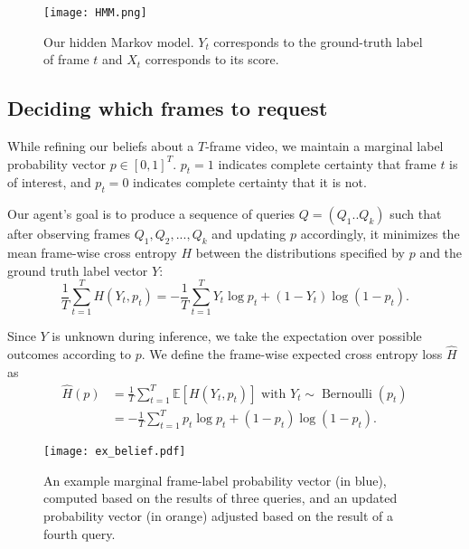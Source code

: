 \documentclass[10pt,twocolumn,letterpaper]{article}
\begin{document}
\begin{figure}[t]
\begin{center}
    \vspace{0.5cm}    
    \texttt{[image: HMM.png]}
\end{center}
   \caption{Our hidden Markov model. $Y_t$ corresponds to the ground-truth label of frame $t$ and $X_t$ corresponds to its score.}
\label{hmm}
\end{figure}

\subsection{Deciding which frames to request}

While refining our beliefs about a $T$-frame video, we maintain a marginal label probability vector $p \in [0,1]^T$. $p_t = 1$ indicates complete certainty that frame $t$ is of interest, and $p_t = 0$ indicates complete certainty that it is not.

Our agent's goal is to produce a sequence of queries $Q = (Q_1..Q_k)$ such that after observing frames $Q_1, Q_2, ..., Q_k$ and updating $p$ accordingly, it minimizes the mean frame-wise cross entropy $H$ between the distributions specified by $p$ and the ground truth label vector $Y$:
$$
    \frac{1}{T} \sum_{t=1}^T H(Y_t, p_t) =
        - \frac{1}{T} \sum_{t=1}^T {
            Y_t \log p_t
            + (1 - Y_t) \log (1 - p_t)
        }.
$$

Since $Y$ is unknown during inference, we take the expectation over possible outcomes according to $p$. We define the frame-wise expected cross entropy loss $\hat{H}$ as
\begin{align*}
    \hat{H}(p) &= {
        \frac{1}{T} \sum_{t=1}^T {
            \mathbb{E}[H(Y_t, p_t)]
            \text{ with }
            Y_t \sim \operatorname{Bernoulli}(p_t)
        }
    } \\
    &= {
        -\frac{1}{T} \sum_{t=1}^T {
            p_t \log p_t + (1 - p_t) \log (1 - p_t)
        }
    }.
\end{align*}

\begin{figure}[t]
\begin{center}
    \texttt{[image: ex\_belief.pdf]}
\end{center}
    \caption{An example marginal frame-label probability vector (in blue), computed based on the results of three queries, and an updated probability vector (in orange) adjusted based on the result of a fourth query.}
\label{ex_belief}
\end{figure}
\end{document}
